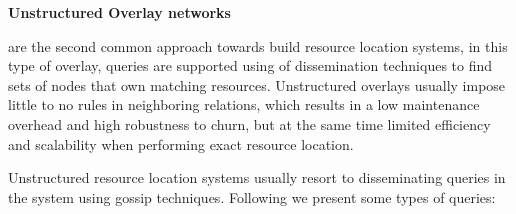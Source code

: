 
\textbf{Unstructured Overlay networks} 

are the second common approach towards build resource location systems, in this type of overlay, queries are supported using of dissemination techniques to find sets of nodes that own matching resources. Unstructured overlays usually impose little to no rules in neighboring relations, which results in a low maintenance overhead and high robustness to churn, but at the same time limited efficiency and scalability when performing exact resource location. 

Unstructured resource location systems usually resort to disseminating queries in the system using gossip techniques. Following we present some types of queries: